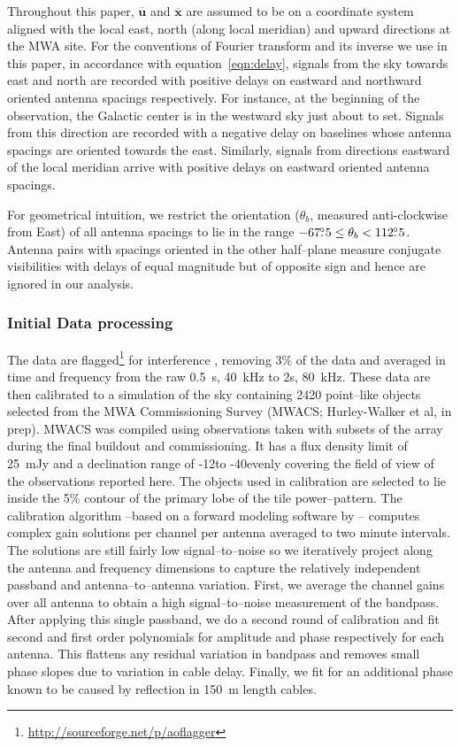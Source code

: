 \documentclass[preprint2,iop,numberedappendix]{emulateapj}
\begin{document}
Throughout this paper, $\overline{\mathbf{u}}$ and $\overline{\mathbf{x}}$ are assumed to be on a coordinate system aligned with the local east, north (along local meridian) and upward directions at the MWA site. For the conventions of Fourier transform and its inverse we use in this paper, in accordance with equation~\ref{eqn:delay}, signals from the sky towards east and north are recorded with positive delays on eastward and northward oriented antenna spacings respectively. For instance, at the beginning of the observation, the Galactic center is in the westward sky just about to set. Signals from this direction are recorded with a negative delay on baselines whose antenna spacings are oriented towards the east. Similarly, signals from directions eastward of the local meridian arrive with positive delays on eastward oriented antenna spacings. 

For geometrical intuition, we restrict the orientation ($\theta_b$, measured anti-clockwise from East) of all antenna spacings to lie in the range $-67\mbox{$.\!\!^\circ$} 5 \leq \theta_b < 112\mbox{$.\!\!^\circ$} 5$. Antenna pairs with spacings oriented in the other half--plane measure conjugate visibilities with delays of equal magnitude but of opposite sign and hence are ignored in our analysis.

\subsubsection{Initial Data processing}\label{sec:data-analysis}

The data are flagged\footnote{\url{http://sourceforge.net/p/aoflagger}} for interference \citep{off12,off10}, removing 3\% of the data and averaged in time  and frequency from the raw 0.5~s, 40~kHz to 2s, 80~kHz. These data are then calibrated to a simulation of the sky containing 2420 point--like objects selected from the MWA Commissioning Survey (MWACS; Hurley-Walker et al, in prep). MWACS was compiled using observations taken with subsets of the array during the final buildout and commissioning. It has a flux density limit of 25~mJy and a declination range of -12\arcdeg to -40\arcdeg evenly covering the field of view of the observations reported here. The objects used in calibration are selected to lie inside the 5\% contour of the primary lobe of the tile power--pattern. The calibration algorithm --based on a forward modeling software by \citet{sul12}-- computes complex gain solutions per channel per antenna averaged to two minute intervals. The solutions are still fairly low signal--to--noise so we iteratively project along the antenna and frequency dimensions to capture the relatively independent passband and antenna--to--antenna variation. First, we average the channel gains over all antenna to obtain a high signal--to--noise measurement of the bandpass. After applying this single passband, we do a second round of calibration and fit second and first order polynomials for amplitude and phase respectively for each antenna. This flattens any residual variation in bandpass and removes small phase slopes due to variation in cable delay. Finally, we fit for an additional phase known to be caused by reflection in 150~m length cables. %
\end{document}
